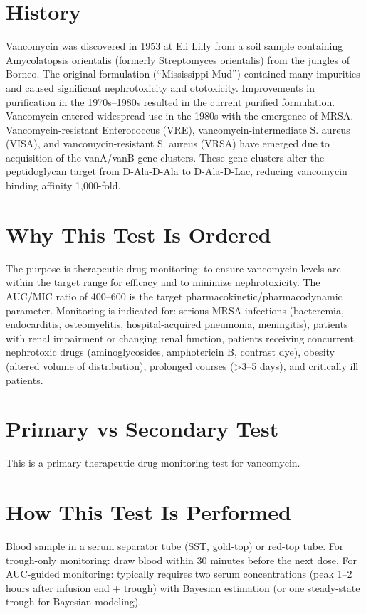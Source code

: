 \section*{History}
Vancomycin was discovered in 1953 at Eli Lilly from a soil sample containing Amycolatopsis orientalis (formerly Streptomyces orientalis) from the jungles of Borneo. The original formulation (``Mississippi Mud'') contained many impurities and caused significant nephrotoxicity and ototoxicity. Improvements in purification in the 1970s--1980s resulted in the current purified formulation. Vancomycin entered widespread use in the 1980s with the emergence of MRSA. Vancomycin-resistant Enterococcus (VRE), vancomycin-intermediate S. aureus (VISA), and vancomycin-resistant S. aureus (VRSA) have emerged due to acquisition of the vanA/vanB gene clusters. These gene clusters alter the peptidoglycan target from D-Ala-D-Ala to D-Ala-D-Lac, reducing vancomycin binding affinity 1,000-fold.

\section*{Why This Test Is Ordered}
The purpose is therapeutic drug monitoring: to ensure vancomycin levels are within the target range for efficacy and to minimize nephrotoxicity. The AUC/MIC ratio of 400--600 is the target pharmacokinetic/pharmacodynamic parameter. Monitoring is indicated for: serious MRSA infections (bacteremia, endocarditis, osteomyelitis, hospital-acquired pneumonia, meningitis), patients with renal impairment or changing renal function, patients receiving concurrent nephrotoxic drugs (aminoglycosides, amphotericin B, contrast dye), obesity (altered volume of distribution), prolonged courses (>3--5 days), and critically ill patients.

\section*{Primary vs Secondary Test}
This is a primary therapeutic drug monitoring test for vancomycin.

\section*{How This Test Is Performed}
Blood sample in a serum separator tube (SST, gold-top) or red-top tube. For trough-only monitoring: draw blood within 30 minutes before the next dose. For AUC-guided monitoring: typically requires two serum concentrations (peak 1--2 hours after infusion end + trough) with Bayesian estimation (or one steady-state trough for Bayesian modeling).

